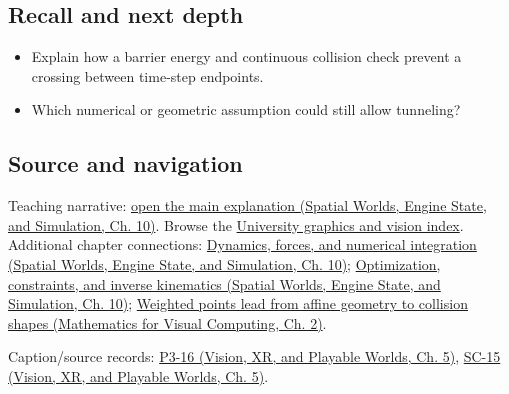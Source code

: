 \subsection{Recall and next depth}\label{appendix-a9ba01fa72a6-recall-and-next-depth}

\begin{itemize}
\tightlist
\item
  Explain how a barrier energy and continuous collision check prevent a crossing between time-step endpoints.
\item
  Which numerical or geometric assumption could still allow tunneling?
\end{itemize}

\subsection{Source and navigation}\label{appendix-a9ba01fa72a6-source-and-navigation}

Teaching narrative: \href{../05-Spatial-Worlds-Engine-State-and-Simulation/main.pdf\#nameddest=04-visual-computing-ii-ch029-dynamics-forces-and-numerical-integration}{open the main explanation (Spatial Worlds, Engine State, and Simulation, Ch. 10)}. Browse the \hyperref[appendix-a6d556a4ef50-university-graphics-vision-and-photography---independent-series]{University graphics and vision index}. Additional chapter connections: \href{../05-Spatial-Worlds-Engine-State-and-Simulation/main.pdf\#nameddest=04-visual-computing-ii-ch029-dynamics-forces-and-numerical-integration}{Dynamics, forces, and numerical integration (Spatial Worlds, Engine State, and Simulation, Ch. 10)}; \href{../05-Spatial-Worlds-Engine-State-and-Simulation/main.pdf\#nameddest=04-visual-computing-ii-ch029-optimization-constraints-and-inverse-kinematics}{Optimization, constraints, and inverse kinematics (Spatial Worlds, Engine State, and Simulation, Ch. 10)}; \href{../02-Mathematics-for-Visual-Computing/main.pdf\#nameddest=01-foundations-i-ch018-weighted-points-lead-from-affine-geometry-to-collision-shapes}{Weighted points lead from affine geometry to collision shapes (Mathematics for Visual Computing, Ch. 2)}.

Caption/source records: \href{../07-Vision-XR-and-Playable-Worlds/main.pdf\#nameddest=04-visual-computing-ii-ch036-p3-16---subdivision-surfaces-part-1}{P3-16 (Vision, XR, and Playable Worlds, Ch. 5)}, \href{../07-Vision-XR-and-Playable-Worlds/main.pdf\#nameddest=04-visual-computing-ii-ch036-sc-15---stanford-cs231n-deep-learning-for-computer-vision-spring-2025-lecture-15-3d-vision}{SC-15 (Vision, XR, and Playable Worlds, Ch. 5)}.
